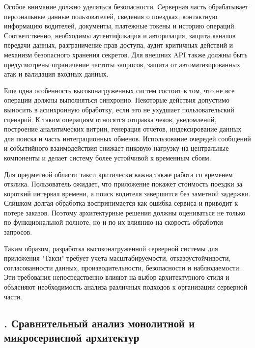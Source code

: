 {\par \redline Особое внимание должно уделяться безопасности. Серверная часть обрабатывает персональные данные пользователей, сведения о поездках, контактную информацию водителей, документы, платежные токены и историю операций. Соответственно, необходимы аутентификация и авторизация, защита каналов передачи данных, разграничение прав доступа, аудит критичных действий и механизм безопасного хранения секретов. Для внешних API также должны быть предусмотрены ограничение частоты запросов, защита от автоматизированных атак и валидация входных данных.

\par \redline Еще одна особенность высоконагруженных систем состоит в том, что не все операции должны выполняться синхронно. Некоторые действия допустимо выносить в асинхронную обработку, если это не ухудшает пользовательский сценарий. К таким операциям относятся отправка чеков, уведомлений, построение аналитических витрин, генерация отчетов, индексирование данных для поиска и часть интеграционных обменов. Использование очередей сообщений и событийного взаимодействия снижает пиковую нагрузку на центральные компоненты и делает систему более устойчивой к временным сбоям.

\par \redline Для предметной области такси критически важна также работа со временем отклика. Пользователь ожидает, что приложение покажет стоимость поездки за короткий интервал времени, а поиск водителя завершится без заметной задержки. Слишком долгая обработка воспринимается как ошибка сервиса и приводит к потере заказов. Поэтому архитектурные решения должны оцениваться не только по функциональной полноте, но и по их влиянию на скорость обработки запросов.

\par \redline Таким образом, разработка высоконагруженной серверной системы для приложения "Такси"{} требует учета масштабируемости, отказоустойчивости, согласованности данных, производительности, безопасности и наблюдаемости. Эти требования непосредственно влияют на выбор архитектурного стиля и объясняют необходимость анализа различных подходов к организации серверной части.
	
	\par
}

\subtitlespace

\subsection*{
	\gostTitleFont
	\redline
	\thechaptercntr .\thesubchaptercntr \spc
	Сравнительный анализ монолитной и микросервисной архитектур
} \addtocounter{subchaptercntr}{1}

